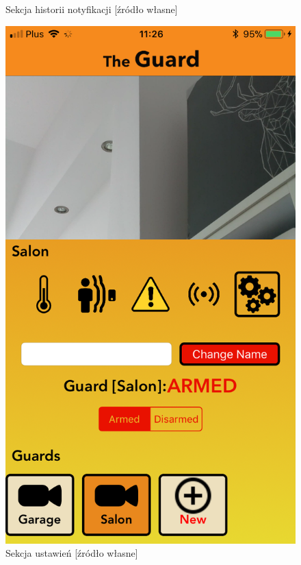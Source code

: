 \begin{figure}[ht]
\begin{minipage}{.4\linewidth}
    \caption{Sekcja historii notyfikacji  [źródło własne]}
    \label{img1}
\end{minipage}
\hspace{.05\linewidth}
\begin{minipage}{.4\linewidth}
    \includegraphics[width=\linewidth]{ios_screenshots/settings.png}
    \caption{Sekcja ustawień [źródło własne]}
    \label{img2}
\end{minipage}
\end{figure} 
